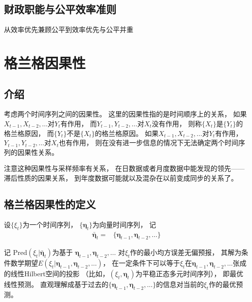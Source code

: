 \documentclass[
]{book}
\theoremstyle{definition}
\theoremstyle{definition}
\theoremstyle{definition}
\theoremstyle{definition}
\theoremstyle{remark}
\begin{document}
\hypertarget{ux8d22ux653fux804cux80fdux4e0eux516cux5e73ux6548ux7387ux51c6ux5219}{%
\section{财政职能与公平效率准则}\label{ux8d22ux653fux804cux80fdux4e0eux516cux5e73ux6548ux7387ux51c6ux5219}}

从效率优先兼顾公平到效率优先与公平并重

\hypertarget{causal}{%
\chapter{格兰格因果性}\label{causal}}

\hypertarget{causal-intro}{%
\section{介绍}\label{causal-intro}}

考虑两个时间序列之间的因果性。
这里的因果性指的是时间顺序上的关系，
如果\(X_{t-1}, X_{t-2}, \dots\)对\(Y_t\)有作用，
而\(Y_{t-1}, Y_{t-2}, \dots\)对\(X_t\)没有作用，
则称\(\{X_t \}\)是\(\{ Y_t \}\)的格兰格原因，
而\(\{ Y_t \}\)不是\(\{ X_t \}\)的格兰格原因。
如果\(X_{t-1}, X_{t-2}, \dots\)对\(Y_t\)有作用，
\(Y_{t-1}, Y_{t-2}, \dots\)对\(X_t\)也有作用，
则在没有进一步信息的情况下无法确定两个时间序列的因果性关系。

注意这种因果性与采样频率有关系，
在日数据或者月度数据中能发现的领先------滞后性质的因果关系，
到年度数据可能就以及混杂在以前变成同步的关系了。

\hypertarget{causal-def}{%
\section{格兰格因果性的定义}\label{causal-def}}

设\(\{ \xi_t \}\)为一个时间序列，
\(\{ \boldsymbol{\eta}_t \}\)为向量时间序列，
记
\[\begin{aligned}
\bar{\boldsymbol{\eta}}_t =& \{ \boldsymbol{\eta}_{t-1}, \boldsymbol{\eta}_{t-2}, \dots \} 
\end{aligned}\]

记
\(\text{Pred}(\xi_t | \bar{\boldsymbol{\eta}}_t)\)为基于
\(\boldsymbol{\eta}_{t-1}, \boldsymbol{\eta}_{t-2}, \dots\)
对\(\xi_t\)作的最小均方误差无偏预报，
其解为条件数学期望\(E(\xi_t | \boldsymbol{\eta}_{t-1}, \boldsymbol{\eta}_{t-2}, \dots)\)，
在一定条件下可以等于\(\xi_t\)在\(\boldsymbol{\eta}_{t-1}, \boldsymbol{\eta}_{t-2}, \dots\)张成的线性Hilbert空间的投影
（比如，\((\xi_t, \boldsymbol{\eta}_t)\)为平稳正态多元时间序列），
即最优线性预测。
直观理解成基于过去的\(\{\boldsymbol{\eta}_{t-1}, \boldsymbol{\eta}_{t-2}, \dots \}\)的信息对当前的\(\xi_t\)作的最优预测。
\end{document}
